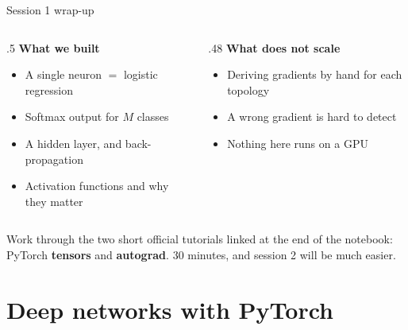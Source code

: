 \documentclass[aspectratio=169,10pt]{beamer}
\newcommand{\sessiontag}{}
\begin{document}
\begin{frame}{Session 1 wrap-up}
\begin{columns}[T]
\begin{column}{.5\textwidth}
\textbf{What we built}
\begin{itemize}\small
  \item A single neuron $=$ logistic regression
  \item Softmax output for $M$ classes
  \item A hidden layer, and back-propagation
  \item Activation functions and why they matter
\end{itemize}
\end{column}
\begin{column}{.48\textwidth}
\textbf{What does not scale}
\begin{itemize}\small
  \item Deriving gradients by hand for each topology
  \item A wrong gradient is hard to detect
  \item Nothing here runs on a GPU
\end{itemize}
\end{column}
\end{columns}
\vspace{1em}
\begin{practice}
Work through the two short official tutorials linked at the end of the notebook:
PyTorch \textbf{tensors} and \textbf{autograd}. 30 minutes, and session 2 will be much
easier.
\end{practice}
\end{frame}

\renewcommand{\sessiontag}{Session 2 \textbullet{} notebook DL2}
\section{Deep networks with PyTorch}
\end{document}
